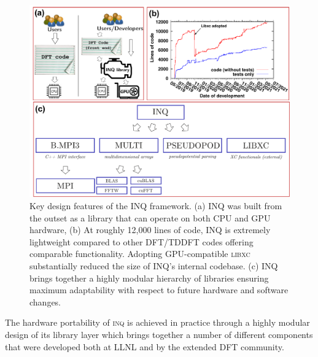 \begin{figure}[h]
	\centering
	\includegraphics[width=0.8\linewidth]{figures/INQ_design_features.pdf}
	\caption{
		Key design features of the INQ framework.
		(a) INQ was built from the outset as a library that can operate on both CPU and GPU hardware,
		(b) At roughly 12,000 lines of code, INQ is extremely lightweight compared to other DFT/TDDFT codes offering comparable functionality.
		Adopting GPU-compatible \textsc{libxc} substantially reduced the size of INQ's internal codebase.
		(c) INQ brings together a highly modular hierarchy of libraries ensuring maximum adaptability with respect to future hardware and software changes.
	}
	\label{fig:inq_design}
\end{figure}

The hardware portability of \textsc{inq} is achieved in practice through a highly modular design of its library layer which brings together a number of different components that were developed both at LLNL and by the extended DFT community. 

